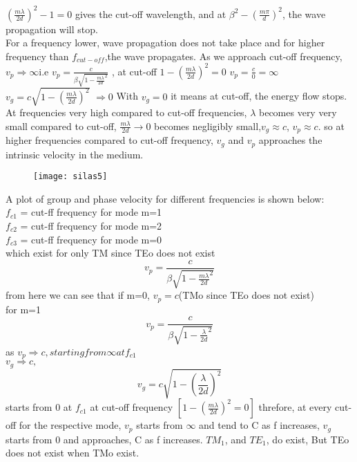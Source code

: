 $(\frac{m\lambda}{2d})^{2} -1=0$ gives the cut-off wavelength, and at $\beta^{2} -(\frac{m\pi}{d})^{2}$, the wave propagation will stop.\\
For a frequency lower, wave propagation does not take place and for higher frequency than $f_{cut-off}$,the wave propagates.
As we approach cut-off frequency, $v_{p}\Rightarrow \infty$i.e $v_{p}= \frac{c}{\beta \sqrt{1- \frac{m \lambda}{2d}^{2}}}$ , at cut-off $1 - (\frac{m\lambda}{2d})^{2}=0$ $v_{p} =\frac{c}{0} =\infty$\\
$v_{g} =c \sqrt{1-(\frac{m\lambda}{2d})^{2}}$ $\Rightarrow 0$
With $v_{g} = 0$ it means at cut-off, the energy flow stops. At frequencies very high compared to cut-off frequencies, $\lambda$ becomes very very small compared to cut-off, $\frac{m\lambda}{2d} \rightarrow 0$ becomes negligibly small,$v_{g} \approx c$, $v_{p} \approx c$. so at higher frequencies compared to cut-off frequency, $v_{g}$ and $v_{p}$ approaches the intrinsic velocity in the medium.\\
\begin{figure}[h]
	\centering
	\texttt{[image: silas5]}
	\caption{}
\end{figure}
A plot of group and phase velocity for different frequencies is shown below:\\
$f_{c1}$ = cut-ff frequency for mode m=1\\
$f_{c2}$ = cut-ff frequency for mode m=2\\
$f_{c3}$ = cut-ff frequency for mode m=0\\
which exist for only TM since TEo does not exist
\begin{equation*}
v_{p}= \frac{c}{\beta \sqrt{1- \frac{m\lambda}{2d}^{2}}}
\end{equation*}
from here we can see that if m=0, $v_{p} =c$(TMo since TEo does not exist)\\
for m=1\\
\begin{equation*}
v_{p}= \frac{c}{\beta \sqrt{1- \frac{\lambda}{2d}^{2}}}
\end{equation*}
as $v_{p} \Rightarrow c, starting from \infty at f_{c1}$\\
$v_{g} \Rightarrow c,$
\begin{equation*}
v_{g}= c\sqrt{1-(\frac{\lambda}{2d})^{2}}
\end{equation*}
starts from 0 at $f_{c1}$ at cut-off frequency $[1-(\frac{m\lambda}{2d})^{2} = 0]$
threfore, at every cut-off for the respective mode, $v_{p}$ starts from $\infty$ and tend to C as f increases, $v_{g}$ starts from 0 and approaches, C as f increases. $TM_{1}$, and $TE_{1}$, do exist, But TEo does not exist when TMo exist.\\ 
